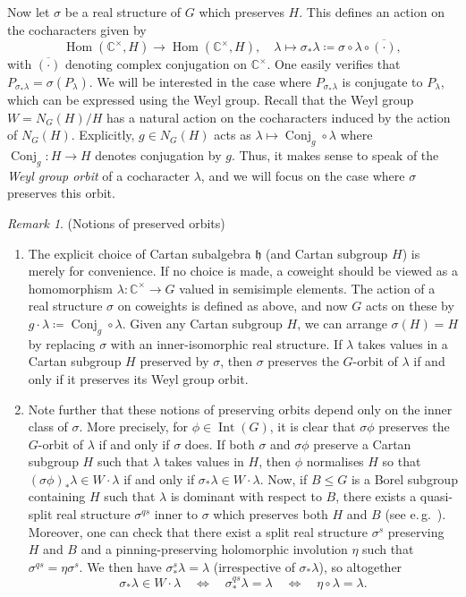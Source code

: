 \documentclass{amsart}
\newcommand{\eg}{e.\,g.}
\newcommand{\C}{\mathbb{C}}
\newcommand{\Conj}{\operatorname{Conj}}
\newcommand{\h}{\mathfrak{h}}
\newcommand{\Hom}{\operatorname{Hom}}
\newcommand{\Int}{\operatorname{Int}}
\theoremstyle{definition}
\theoremstyle{plain}
\theoremstyle{remark}
\newtheorem{rmk}[defn]{Remark}
\begin{document}
Now let $\sigma$ be a real structure of $G$ which preserves $H$. This defines an action on the cocharacters given by
$$
    \Hom(\C^\times, H)\to \Hom(\C^\times, H),
    \quad
    \lambda\mapsto \sigma_*\lambda \coloneqq \sigma\circ \lambda \circ \overline{(\cdot)},
$$
with $\overline{(\cdot)}$ denoting complex conjugation on $\C^\times$. One easily verifies that $P_{\sigma_*\lambda} = \sigma(P_\lambda)$. We will be interested in the case where $P_{\sigma_*\lambda}$ is conjugate to $P_\lambda$, which can be expressed using the Weyl group. Recall that the Weyl group $W = N_G(H)/H$ has a natural action on the cocharacters induced by the action of $N_G(H)$. Explicitly, $g\in N_G(H)$ acts as $\lambda \mapsto \Conj_g\circ \lambda$ where $\Conj_g\colon H\to H$ denotes conjugation by $g$. Thus, it makes sense to speak of the \emph{Weyl group orbit} of a cocharacter $\lambda$, and we will focus on the case where $\sigma$ preserves this orbit.

\begin{rmk}(Notions of preserved orbits)
\label{rmk:notions_of_preserving}
\begin{enumerate}
    \item The explicit choice of Cartan subalgebra $\h$ (and Cartan subgroup $H$) is merely for convenience. If no choice is made, a coweight should be viewed as a homomorphism $\lambda\colon \C^\times \to G$ valued in semisimple elements. The action of a real structure $\sigma$ on coweights is defined as above, and now $G$ acts on these by $g\cdot \lambda \coloneqq \Conj_g\circ \lambda$. Given any Cartan subgroup $H$, we can arrange $\sigma(H) = H$ by replacing $\sigma$ with an inner-isomorphic real structure. If $\lambda$ takes values in a Cartan subgroup $H$ preserved by $\sigma$, then $\sigma$ preserves the $G$-orbit of $\lambda$ if and only if it preserves its Weyl group orbit.

    \item Note further that these notions of preserving orbits depend only on the inner class of $\sigma$. More precisely, for $\phi\in \Int(G)$, it is clear that $\sigma\phi$ preserves the $G$-orbit of $\lambda$ if and only if $\sigma$ does. If both $\sigma$ and $\sigma \phi$ preserve a Cartan subgroup $H$ such that $\lambda$ takes values in $H$, then $\phi$ normalises $H$ so that $(\sigma\phi)_*\lambda \in W\cdot \lambda$ if and only if $\sigma_*\lambda \in W\cdot \lambda$. Now, if $B\le G$ is a Borel subgroup containing $H$ such that $\lambda$ is dominant with respect to $B$, there exists a quasi-split real structure $\sigma^{qs}$ inner to $\sigma$ which preserves both $H$ and $B$ (see \eg\ \cite[Problem VI.31]{KnappLG}). Moreover, one can check that there exist a split real structure $\sigma^s$ preserving $H$ and $B$ and a pinning-preserving holomorphic involution $\eta$ such that $\sigma^{qs} = \eta\sigma^s$. We then have $\sigma^s_*\lambda = \lambda$ (irrespective of $\sigma_*\lambda$), so altogether 
    $$
        \sigma_*\lambda \in W\cdot \lambda
        \quad \Leftrightarrow \quad
        \sigma^{qs}_*\lambda = \lambda
        \quad \Leftrightarrow \quad
        \eta\circ \lambda = \lambda.
    $$
\end{enumerate}
\end{rmk}
\end{document}
